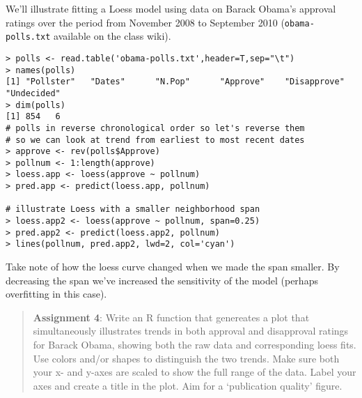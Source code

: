 \documentclass{article}
\begin{document}
We'll illustrate fitting a Loess model using data on Barack Obama's
approval ratings over the period from November 2008 to September 2010
(\lstinline!obama-polls.txt! available on the class wiki).

\begin{lstlisting}
> polls <- read.table('obama-polls.txt',header=T,sep="\t")
> names(polls)
[1] "Pollster"   "Dates"      "N.Pop"      "Approve"    "Disapprove" "Undecided" 
> dim(polls)
[1] 854   6    
# polls in reverse chronological order so let's reverse them
# so we can look at trend from earliest to most recent dates
> approve <- rev(polls$Approve)
> pollnum <- 1:length(approve)
> loess.app <- loess(approve ~ pollnum)
> pred.app <- predict(loess.app, pollnum)

# illustrate Loess with a smaller neighborhood span
> loess.app2 <- loess(approve ~ pollnum, span=0.25)
> pred.app2 <- predict(loess.app2, pollnum)
> lines(pollnum, pred.app2, lwd=2, col='cyan')
\end{lstlisting}
Take note of how the loess curve changed when we made the span smaller.
By decreasing the span we've increased the sensitivity of the model
(perhaps overfitting in this case).

\begin{quote}
\textbf{Assignment 4}: Write an R function that genereates a plot that
simultaneously illustrates trends in both approval and disapproval
ratings for Barack Obama, showing both the raw data and corresponding
loess fits. Use colors and/or shapes to distinguish the two trends. Make
sure both your x- and y-axes are scaled to show the full range of the
data. Label your axes and create a title in the plot. Aim for a
`publication quality' figure.

\end{quote}
\end{document}
